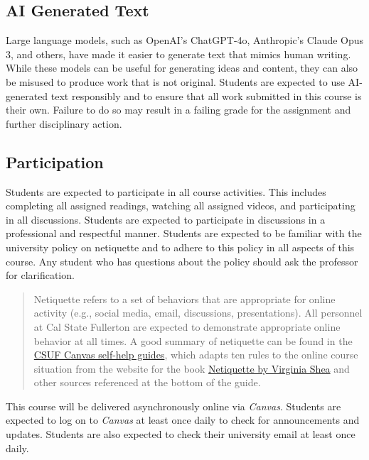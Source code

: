 \documentclass[12pt, letterpaper]{article}
\begin{document}
\subsection*{AI Generated Text} 
Large language models, such as OpenAI's ChatGPT-4o, Anthropic's Claude Opus 3, and others, have made it easier to generate text that mimics human writing. While these models can be useful for generating ideas and content, they can also be misused to produce work that is not original. Students are expected to use AI-generated text responsibly and to ensure that all work submitted in this course is their own. Failure to do so may result in a failing grade for the assignment and further disciplinary action.

\subsection*{Participation}

Students are expected to participate in all course activities. This includes completing all assigned readings, watching all assigned videos, and participating in all discussions. Students are expected to participate in discussions in a professional and respectful manner. Students are expected to be familiar with the university policy on netiquette and to adhere to this policy in all aspects of this course. Any student who has questions about the policy should ask the professor for clarification. 

\begin{quote}Netiquette refers to a set of behaviors that are appropriate for online activity (e.g., social media, email, discussions, presentations). All personnel at Cal State Fullerton are expected to demonstrate appropriate online behavior at all times. A good summary of netiquette can be found in the \href{https://canvashelp.fullerton.edu/m/Student/l/1336786-student-what-is-netiquette}{CSUF Canvas self-help guides}, which adapts ten rules to the online course situation from the website for the book \href{http://www.albion.com/netiquette/corerules.html}{Netiquette by Virginia Shea} and other sources referenced at the bottom of the guide.\end{quote}

\noindent This course will be delivered asynchronously online via \emph{Canvas}. Students are expected to log on to \emph{Canvas} at least once daily to check for announcements and updates. Students are also expected to check their university email at least once daily.
\end{document}
